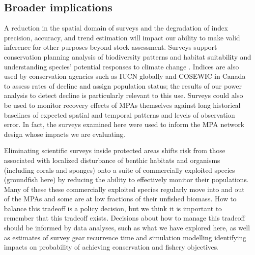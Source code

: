 \documentclass[12pt]{article}
\begin{document}
\begin{spacing}{1.4}
\subsection*{Broader implications}

A reduction in the spatial domain of surveys and the degradation of index precision, accuracy, and trend estimation will impact our ability to make valid inference for other purposes beyond stock assessment.
Surveys support conservation planning analysis of biodiversity patterns and habitat suitability \citep[e.g.,][]{rubidge2016, thompson2022meps} and understanding species' potential responses to climate change \citep[e.g.,][]{english2021, thompson2023warming}.
Indices are also used by conservation agencies such as IUCN globally \citep{iucn2012} and COSEWIC in Canada \citep{cosewicTable2} to assess rates of decline and assign population status; the results of our power analysis to detect decline is particularly relevant to this use.
Surveys could also be used to monitor recovery effects of MPAs themselves against long historical baselines of expected spatial and temporal patterns and levels of observation error.
In fact, the surveys examined here were used to inform the MPA network design whose impacts we are evaluating.


Eliminating scientific surveys inside protected areas shifts risk from those associated with localized disturbance of benthic habitats and organisms (including corals and sponges) onto a suite of commercially exploited species (groundfish here) by reducing the ability to effectively monitor their populations.
Many of these these commercially exploited species regularly move into and out of the MPAs and some are at low fractions of their unfished biomass.
How to balance this tradeoff is a policy decision, but we think it is important to remember that this tradeoff exists.
Decisions about how to manage this tradeoff should be informed by data analyses, such as what we have explored here, as well as estimates of survey gear recurrence time \citep{benoit2020national} and simulation modelling identifying impacts on probability of achieving conservation and fishery objectives.


\end{spacing}
\end{document}
